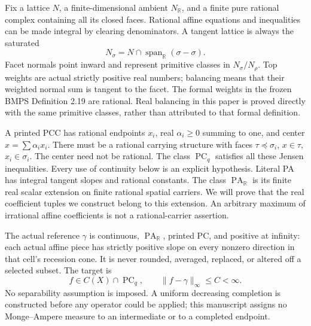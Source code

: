 \documentclass[11pt]{article}
\newcommand{\R}{\mathbb R}
\newcommand{\PA}{\operatorname{PA}}
\newcommand{\PC}{\operatorname{PC}_q}
\begin{document}
Fix a lattice $N$, a finite-dimensional ambient $N_\R$, and a finite pure rational complex containing all its closed faces. Rational affine equations and inequalities can be made integral by clearing denominators. A tangent lattice is always the saturated
\[
N_\sigma=N\cap\operatorname{span}_\R(\sigma-\sigma).
\]
Facet normals point inward and represent primitive classes in $N_\sigma/N_\rho$. Top weights are actual strictly positive real numbers; balancing means that their weighted normal sum is tangent to the facet. The formal weights in the frozen BMPS Definition 2.19 are rational. Real balancing in this paper is proved directly with the same primitive classes, rather than attributed to that formal definition.

A printed PCC has rational endpoints $x_i$, real $\alpha_i\geq0$ summing to one, and center $x=\sum\alpha_i x_i$. There must be a rational carrying structure with faces $\tau\preceq\sigma_i$, $x\in\tau$, $x_i\in\sigma_i$. The center need not be rational. The class $\PC$ satisfies all these Jensen inequalities. Every use of continuity below is an explicit hypothesis. Literal PA has integral tangent slopes and rational constants. The class $\PA_\R$ is its finite real scalar extension on finite rational spatial carriers. We will prove that the real coefficient tuples we construct belong to this extension. An arbitrary maximum of irrational affine coefficients is not a rational-carrier assertion.

The actual reference $\gamma$ is continuous, $\PA_\R$, printed PC, and positive at infinity: each actual affine piece has strictly positive slope on every nonzero direction in that cell's recession cone. It is never rounded, averaged, replaced, or altered off a selected subset. The target is
\[
f\in C(X)\cap\PC,\qquad \|f-\gamma\|_\infty\leq C<\infty.
\]
No separability assumption is imposed. A uniform decreasing completion is constructed before any operator could be applied; this manuscript assigns no Monge--Ampere measure to an intermediate or to a completed endpoint.
\end{document}
